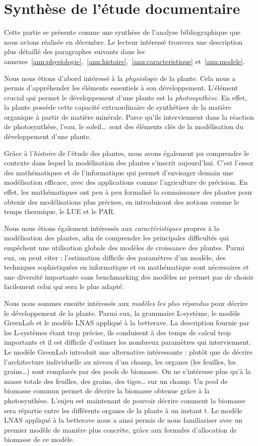 \section{Synthèse de l'étude documentaire}
Cette partie se présente comme une synthèse de l’analyse bibliographique que nous avions réalisée en décembre.
Le lecteur intéressé trouvera une description plus détaillé des paragraphes suivants
dans les annexes~\ref{ann:physiologie},~\ref{ann:histoire},~\ref{ann:caracteristique}
et~\ref{ann:modele}.

Nous nous étions d’abord intéressé à la \emph{physiologie} de la plante. Cela nous a permis d’appréhender les éléments essentiels à son développement.
L’élément crucial qui permet le développement d’une plante est la \emph{photosynthèse}. En effet, la plante possède cette capacité extraordinaire de synthétiser de la matière organique à partir de matière minérale. 
Parce qu’ils interviennent dans la réaction de photosynthèse, l’eau, le soleil\dots ~sont des éléments clés de la modélisation du développement d’une plante.

Grâce à l’\emph{histoire} de l’étude des plantes, nous avons également pu comprendre le contexte dans lequel la modélisation des plantes s’inscrit aujourd’hui. C’est l’essor des mathématiques et de l’informatique qui permet d’envisager demain une modélisation efficace, avec des applications comme l’agriculture de précision. 
En effet, les mathématiques ont peu à peu formalisé la connaissance des plantes pour obtenir des modélisations plus précises, en introduisant des notions comme le temps thermique, le LUE et le PAR.

Nous nous étions également intéressés aux \emph{caractéristiques} propres à la modélisation des plantes, afin de comprendre les principales difficultés qui empêchent une utilisation globale des modèles de croissance des plantes. Parmi eux, on peut citer : l’estimation difficile des paramètres d’un modèle, des techniques sophistiquées en informatique et en mathématique sont nécessaires et une diversité importante sans benchmarking des modèles ne permet pas de choisir facilement celui qui sera le plus adapté. 

Nous nous sommes ensuite intéressés aux \emph{modèles les plus répandus} pour décrire le développement de la plante. Parmi eux, la grammaire L-système, le modèle GreenLab et le modèle LNAS appliqué à la betterave. La description fournie par les L-systèmes étant trop précise, ils conduisent à des temps de calcul trop importants et il est difficile d’estimer les nombreux paramètres qui interviennent.
Le modèle GreenLab introduit une alternative intéressante : plutôt que de décrire l’architecture individuelle au niveau d’un champ, les organes (les feuilles, les grains…) sont remplacés par des pools de biomasse. On ne s’intéresse plus qu’à la masse totale des feuilles, des grains, des tiges… sur un champ. Un pool de biomasse commun permet de décrire la biomasse obtenue grâce à la photosynthèse. L’enjeu est maintenant de pouvoir décrire comment la biomasse sera répartie entre les différents organes de la plante à un instant $t$. Le modèle LNAS appliqué à la betterave nous a ainsi permis de nous familiariser avec un premier modèle de manière plus concrète, grâce aux formules d’allocation de biomasse de ce modèle.

